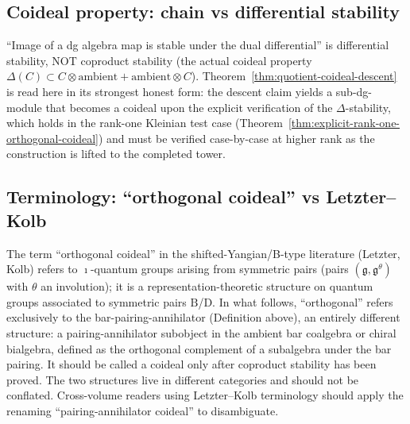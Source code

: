 \subsection{Coideal property: chain vs differential stability}
\label{subsec:shifted-rtt-coideal-discipline}

\begin{remark}
\label{rem:shifted-rtt-coideal-discipline}
``Image of a dg algebra map is stable under the dual differential''
is differential stability, NOT coproduct stability (the actual
coideal property $\Delta(C) \subset C\otimes\text{ambient} +
\text{ambient}\otimes C$). Theorem~\ref{thm:quotient-coideal-descent}
is read here in its strongest honest form: the descent claim
yields a sub-dg-module that becomes a coideal upon the explicit
verification of the $\Delta$-stability, which holds in the
rank-one Kleinian test case
(Theorem~\ref{thm:explicit-rank-one-orthogonal-coideal}) and must be
verified case-by-case at higher rank as the construction is lifted to
the completed tower.
\end{remark}

\subsection{Terminology: ``orthogonal coideal'' vs Letzter--Kolb}
\label{subsec:shifted-rtt-terminology}

\begin{remark}
\label{rem:shifted-rtt-terminology}
The term ``orthogonal coideal'' in the
shifted-Yangian/B-type literature (Letzter, Kolb) refers to
$\imath$-quantum groups arising from symmetric pairs (pairs
$(\mathfrak{g}, \mathfrak{g}^\theta)$ with $\theta$ an
involution); it is a representation-theoretic structure on
quantum groups associated to symmetric pairs $\mathrm{B}$/$\mathrm{D}$.
In what follows, ``orthogonal'' refers exclusively to the
bar-pairing-annihilator (Definition above), an entirely different
structure: a pairing-annihilator subobject in the ambient bar coalgebra
or chiral bialgebra, defined as the orthogonal complement of a
subalgebra under the bar pairing. It should be called a coideal only
after coproduct stability has been proved.
The two structures live in different categories and should not
be conflated. Cross-volume readers using Letzter--Kolb terminology
should apply the renaming ``pairing-annihilator coideal'' to
disambiguate.
\end{remark}

